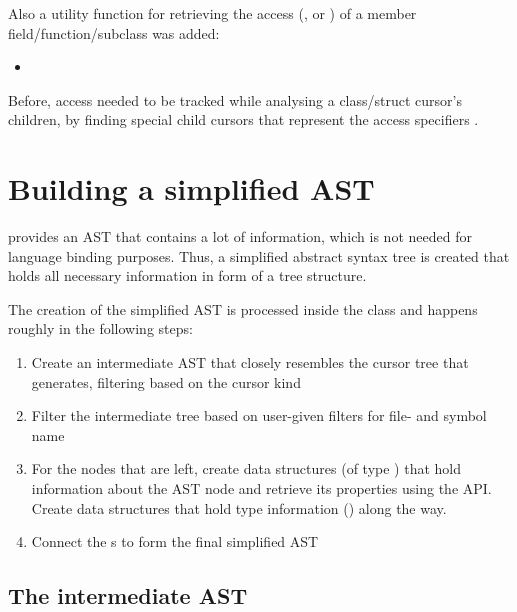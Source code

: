 Also a utility function for retrieving the access (,  or ) of a  member field/function/subclass was added:
\begin{itemize}\addtolength{\itemsep}{-0.5\baselineskip}
\item {}
\end{itemize}

Before, access needed to be tracked while analysing a class/struct cursor's children, by finding special child cursors that represent the  access specifiers .

\section{Building a simplified AST}

 provides an AST that contains a lot of information, which is not needed for language binding purposes. Thus, a simplified abstract syntax tree is created that holds all necessary information in form of a tree structure.

The creation of the simplified AST is processed inside the  class and happens roughly in the following steps:

\begin{enumerate}\addtolength{\itemsep}{-0.5\baselineskip}
\item Create an intermediate AST that closely resembles the cursor tree that  generates, filtering based on the cursor kind
\item Filter the intermediate tree based on user-given filters for file- and symbol name
\item For the nodes that are left, create data structures (of type ) that hold information about the AST node and retrieve its properties using the  API. Create data structures that hold type information () along the way.
\item Connect the s to form the final simplified AST 
\end{enumerate}

\subsection{The intermediate AST}

